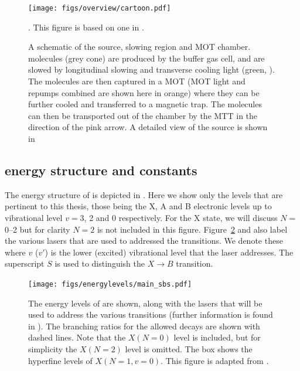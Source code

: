 \begin{figure}
  \centering
  \texttt{[image: figs/overview/cartoon.pdf]}
  \caption{A schematic of the \CaF{} source, slowing region and MOT chamber.
  \CaF{} molecules (grey cone) are produced by the buffer gas cell, and are
  slowed by longitudinal slowing and transverse cooling light (green,
  ). The molecules are then captured in a MOT (MOT light
   and repumps combined are shown here in orange) where
  they can be further cooled and transferred to a magnetic trap. The molecules
  can then be transported out of the chamber by the MTT in the direction of the
  pink arrow. A detailed view of the source is shown in
  }. This figure is based on one in
  .
  \label{overview:fig:CaFcartoon}
\end{figure}

\subsection*{\CaF{} energy structure and constants}

The energy structure of \CaF{} is depicted in
. Here we show only the levels that are
pertinent to this thesis, those being the X, A and B electronic levels up to
vibrational level $v=3$, 2 and 0 respectively.  For the X state, we
will discuss $N=$ \numrange{0}{2} but for clarity $N=2$ is not included in this
figure.
%
Figure~\ref{overview:fig:CaFenergy} and  also
label the various lasers that are used to addressed the \CaF{} transitions. We
denote these  where $v$ ($v'$) is the lower (excited)
vibrational level that the laser addresses. The superscript $S$ is used to
distinguish the $X\rightarrow B$ transition.

\begin{figure}
  \centering
  \texttt{[image: figs/energylevels/main\_sbs.pdf]}
  \caption{
    The energy levels of \CaF{} are shown, along with the lasers that will be
    used to address the various transitions (further information is found in
    ). The branching ratios for the allowed
    decays are shown with dashed lines. Note that the $X(N=0)$ level is
    included, but for simplicity the $X(N=2)$ level is omitted. The box shows
    the hyperfine levels of $X(N=1, v=0)$. This figure is adapted from
    . 
  }
  \label{overview:fig:CaFenergy}
\end{figure}

